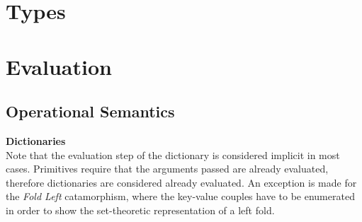 \documentclass[a4paper, 11pt]{article}
\begin{document}
\begin{multicols}{2}
\section{Types}

\section{Evaluation}
\subsection{Operational Semantics}

\textbf{Dictionaries}\\
Note that the evaluation step of the dictionary is considered implicit in most
cases. Primitives require that the arguments passed are already evaluated,
therefore dictionaries are considered already evaluated. An exception is made
for the \textit{Fold Left} catamorphism, where the key-value couples have
to be enumerated in order to show the set-theoretic representation of a left fold.



\end{multicols}
\end{document}
